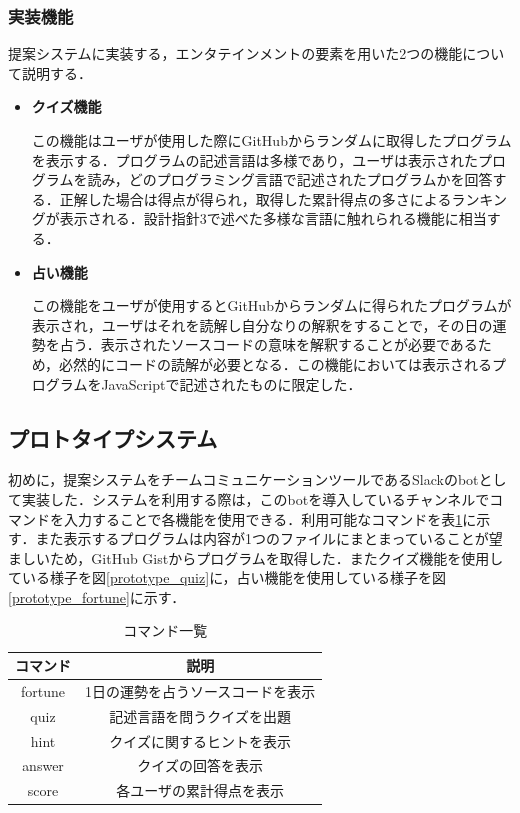 \subsubsection{実装機能}
提案システムに実装する，エンタテインメントの要素を用いた2つの機能について説明する．
\begin{itemize}
  \item {\bf クイズ機能}

  この機能はユーザが使用した際にGitHubからランダムに取得したプログラムを表示する．プログラムの記述言語は多様であり，ユーザは表示されたプログラムを読み，どのプログラミング言語で記述されたプログラムかを回答する．正解した場合は得点が得られ，取得した累計得点の多さによるランキングが表示される．設計指針3で述べた多様な言語に触れられる機能に相当する．

  \item {\bf 占い機能}

  この機能をユーザが使用するとGitHubからランダムに得られたプログラムが表示され，ユーザはそれを読解し自分なりの解釈をすることで，その日の運勢を占う．表示されたソースコードの意味を解釈することが必要であるため，必然的にコードの読解が必要となる．この機能においては表示されるプログラムをJavaScriptで記述されたものに限定した．

\end{itemize}

\subsection{プロトタイプシステム}
初めに，提案システムをチームコミュニケーションツールであるSlackのbotとして実装した．システムを利用する際は，このbotを導入しているチャンネルでコマンドを入力することで各機能を使用できる．利用可能なコマンドを表\ref{function}に示す．また表示するプログラムは内容が1つのファイルにまとまっていることが望ましいため，GitHub Gist\cite{gist}からプログラムを取得した．またクイズ機能を使用している様子を図\ref{prototype_quiz}に，占い機能を使用している様子を図\ref{prototype_fortune}に示す．

\begin{table}[!ht]
  \centering
    \caption{コマンド一覧}
      \begin{tabular}{|c|c|} \hline
        コマンド & 説明 \\ \hline \hline
        fortune & 1日の運勢を占うソースコードを表示 \\ \hline
        quiz & 記述言語を問うクイズを出題 \\ \hline
        hint & クイズに関するヒントを表示 \\ \hline
        answer & クイズの回答を表示 \\ \hline
        score & 各ユーザの累計得点を表示 \\ \hline
      \end{tabular}
    \label{function}
  \end{table}

